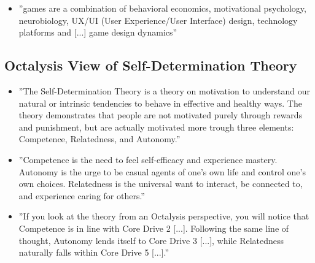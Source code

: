 \begin{itemize}
    \item ''games are a combination of behavioral economics, motivational psychology, neurobiology, UX/UI (User Experience/User Interface) design, technology platforms and [...] game design dynamics''
\end{itemize}

\subsection{Octalysis View of Self-Determination Theory}
\begin{itemize}
    \item ''The Self-Determination Theory is a theory on motivation to understand our natural or intrinsic tendencies to behave in effective and healthy ways. The theory demonstrates that people are not motivated purely through rewards and punishment, but are actually motivated more trough three elements: Competence, Relatedness, and Autonomy.''
    \item ''Competence is the need to feel self-efficacy and experience mastery. Autonomy is the urge to be casual agents of one's own life and control one's own choices. Relatedness is the universal want to interact, be connected to, and experience caring for others.''
    \item ''If you look at the theory from an Octalysis perspective, you will notice that Competence is in line with Core Drive 2 [...]. Following the same line of thought, Autonomy lends itself to Core Drive 3 [...], while Relatedness naturally falls within Core Drive 5 [...].''
\end{itemize}

